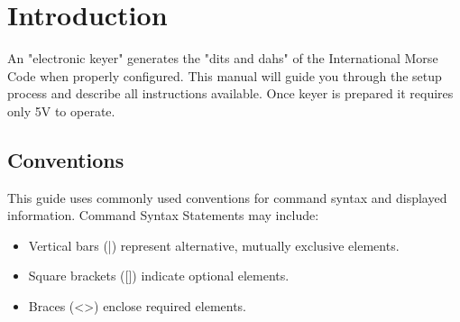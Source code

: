 \documentclass{tufte-book} %
\begin{document}

\cleardoublepage
\chapter*{Introduction} %

%

\begin{fullwidth}
	
An "electronic keyer" generates the "dits and dahs" of the International Morse Code when properly configured. This manual will guide you through the setup process and describe all instructions available. Once keyer is prepared it requires only 5V to operate. 
\end{fullwidth}
	
\section{Conventions}

This guide uses commonly used conventions for command syntax and displayed information. Command Syntax Statements may include:
\begin{itemize}
	\item Vertical bars (|) represent alternative, mutually exclusive elements.
	\item Square brackets ([]) indicate optional elements.
	\item Braces (<>) enclose required elements.
\end{itemize}




\end{document}
